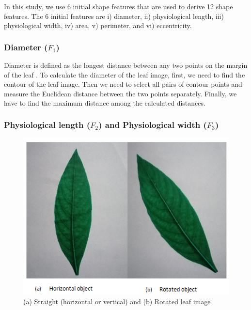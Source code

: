 \documentclass{article}
\begin{document}
In this study, we use 6 initial shape features that are used to
derive 12 shape features. The 6 initial features are i) diameter, ii)
physiological length, iii) physiological width, iv) area, v) perimeter,
and vi) eccentricity.

\hypertarget{diameter-f_1}{%
\subsubsection{\texorpdfstring{Diameter
(\(F_1\))}{Diameter (F\_1)}}\label{diameter-f_1}}

Diameter is defined as the longest distance between any two points
on the margin of the leaf \citep{articlee}. To calculate the
diameter of the leaf image, first, we need to find the contour of the
leaf image. Then we need to select all pairs of contour points and
measure the Euclidean distance between the
two points separately. Finally, we have to find the maximum distance
among the calculated distances.







\hypertarget{physiological-length-f_2-and-physiological-width-f_3}{%
\subsubsection{\texorpdfstring{Physiological length (\(F_2\)) and
Physiological width
(\(F_3\))}{Physiological length (F\_2) and Physiological width (F\_3)}}\label{physiological-length-f_2-and-physiological-width-f_3}}

\begin{figure}[!ht]

{\centering \includegraphics[width=0.3\linewidth]{leaffeatures/act3_new} 

}

\caption{\label{act3}(a) Straight (horizontal or vertical) and (b) Rotated leaf image }\label{fig:act3}
\end{figure}
\end{document}
